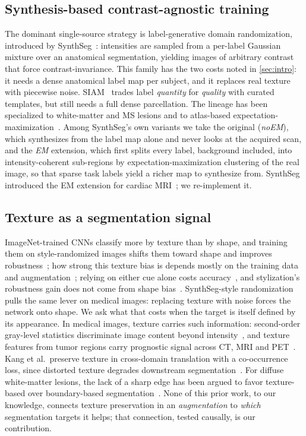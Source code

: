 \subsection{Synthesis-based contrast-agnostic training}
\label{subsec:synth}

The dominant single-source strategy is label-generative domain randomization,
introduced by SynthSeg~\cite{billot2023synthseg}: intensities are sampled from a
per-label Gaussian mixture over an anatomical segmentation, yielding images of
arbitrary contrast that force contrast-invariance. This family has the two costs noted in \cref{sec:intro}: it needs a dense
anatomical label map per subject, and it replaces real texture with piecewise
noise. SIAM~\cite{valabregue2026siam} trades label \emph{quantity} for
\emph{quality} with curated templates, but still needs a full dense
parcellation. The lineage has been specialized to
white-matter and MS lesions and to atlas-based
expectation-maximization~\cite{laso2024wmhsynthseg,caselles2026timelesseg,cerri2021samseg}.
Among SynthSeg's own variants we take the
original (\emph{noEM}), which synthesizes from the label map alone and never
looks at the acquired scan, and the \emph{EM} extension, which first splits
every label, background included, into intensity-coherent sub-regions by
expectation-maximization clustering of the real image, so that sparse task
labels yield a richer map to synthesize from. SynthSeg introduced the EM extension for cardiac
MRI~\cite[\S5.4]{billot2023synthseg}; we re-implement it.

\subsection{Texture as a segmentation signal}
\label{subsec:texture}

ImageNet-trained CNNs classify more by texture than by shape, and training
them on style-randomized images shifts them toward shape and improves
robustness~\cite{geirhos2019texturebias}; how strong this texture bias is
depends mostly on the training data and
augmentation~\cite{hermann2020texturebias}; relying on either cue alone costs
accuracy~\cite{li2021shapetexture}, and stylization's robustness gain does not
come from shape bias~\cite{mummadi2021shapebias}. SynthSeg-style randomization
pulls the same lever on medical images: replacing texture with noise forces
the network onto shape. We ask what that costs when the target is itself
defined by its appearance. In medical images, texture carries such
information: second-order gray-level statistics discriminate image content
beyond intensity~\cite{haralick1973texture}, and texture features from tumor
regions carry prognostic signal across CT, MRI and
PET~\cite{lambin2012radiomics}. Kang et al.\ preserve texture in
cross-domain translation with a co-occurrence loss, since distorted texture
degrades downstream segmentation~\cite{kang2023structurepreserving}.
For diffuse white-matter lesions, the lack of a sharp edge has been argued to
favor texture-based over boundary-based segmentation~\cite{kruggel2008texture}. None of
this prior work, to our knowledge, connects texture preservation in an
\emph{augmentation} to \emph{which} segmentation targets it helps; that
connection, tested causally, is our contribution.


